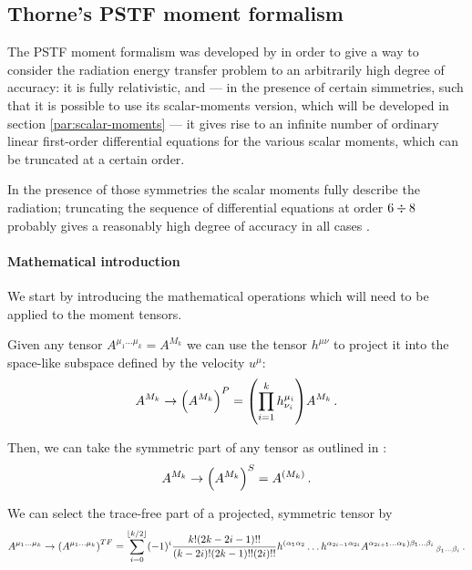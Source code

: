 \documentclass[main.tex]{subfiles}
\begin{document}
\subsection{Thorne's PSTF moment formalism}

The PSTF moment formalism was developed by \textcite{Thorne:1981feb} in order to give a way to consider the radiation energy transfer problem to an arbitrarily high degree of accuracy: it is fully relativistic, and --- in the presence of certain simmetries, such that it is possible to use its scalar-moments version, which will be developed in section \ref{par:scalar-moments} --- it gives rise to an infinite number of ordinary linear first-order differential equations for the various scalar moments, which can be truncated at a certain order.

In the presence of those symmetries the scalar moments fully describe the radiation; truncating the sequence of differential equations at order \(6 \divisionsymbol 8\) probably gives a reasonably high degree of accuracy in all cases \cite[p. 1285]{TurollaNobili:1988}.

\paragraph{Mathematical introduction}

We start by introducing the mathematical operations which will need to be applied to the moment tensors.

Given any tensor \(A^{\mu_1 \dots \mu_k} = A^{M_k}\) we can use the tensor \(h^{\mu\nu}\) to project it into the space-like subspace defined by the velocity \(u^\mu\):
\begin{equation}
    A^{M_k} \rightarrow \qty(A^{M_k})^P
    = \qty(\prod_{i=1}^k h^{\mu_i}_{\nu_i}) A^{M_k} \,.
\end{equation}

Then, we can take the symmetric part of any tensor as outlined in :
\begin{equation}
    A^{M_k} \rightarrow \qty(A^{M_k})^S
    = A^{(M_k)} \,.
\end{equation}

We can select the trace-free part of a projected, symmetric tensor by
\begin{equation}
    A^{\mu_1 \dots \mu_k} \rightarrow \qty(A^{\mu_1 \dots \mu_k})^{TF}
    = \sum _{i=0}   ^{\lfloor k/2 \rfloor}
    (-1)^i \frac{k! (2k-2i-1)!!}{(k-2i)! (2k-1)!! (2i)!!}
    h^{(\alpha_1 \alpha_2} \dots h^{\alpha_{2i-1} \alpha_{2i}}
    A^{\alpha_{2i+1} \dots \alpha_k) \beta_1 \dots \beta_i}\,_{\beta_1 \dots \beta_i} \,.
\end{equation}
\end{document}
